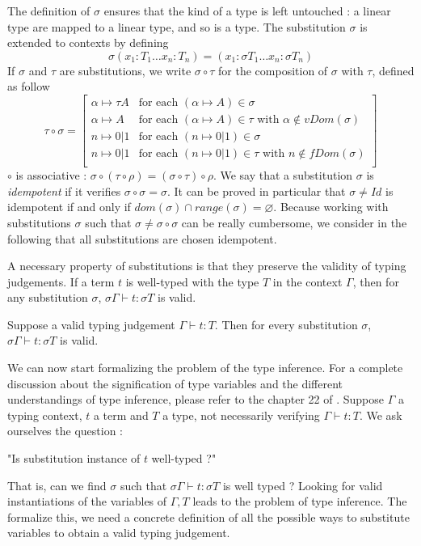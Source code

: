 \begin{defn}
 	The definition of $\sigma$ ensures that the kind of a type is left untouched : a linear type are mapped to a linear type, and so is a
 	type. The substitution $\sigma$ is extended to contexts by defining 
 		$$\sigma (x_1 : T_1 \dots x_n : T_n) = (x_1 : \sigma T_1 \dots x_n : \sigma T_n)$$
	If $\sigma$ and $\tau$ are substitutions, we write $\sigma \circ \tau$ for the composition of $\sigma$ with $\tau$, defined as follow
		$$\tau \circ \sigma = \left[ \begin{array}{ll}
																			\alpha \mapsto \tau A & \text{for each } (\alpha \mapsto A) \in \sigma \\
																			\alpha \mapsto A & \text{for each } (\alpha \mapsto A) \in \tau \text{ with } \alpha \notin vDom(\sigma) \\
																			n \mapsto 0|1 & \text{for each } (n \mapsto 0|1) \in \sigma \\
																			n \mapsto 0|1 & \text{for each } (n \mapsto 0|1) \in \tau \text{ with } n \notin fDom(\sigma) \\
																		\end{array} \right]$$
 	$\circ$ is associative : $\sigma \circ (\tau \circ \rho) = (\sigma \circ \tau) \circ \rho$. We say that a substitution $\sigma$ is
 	\textit{idempotent} if it verifies $\sigma \circ \sigma = \sigma$. It can be proved in particular that $\sigma \neq Id$ is idempotent if and
 	only if $dom(\sigma) \cap range(\sigma) = \varnothing$. Because working with substitutions $\sigma$ such that
 	$\sigma \neq \sigma \circ \sigma$ can be really cumbersome, we consider in the following that all substitutions are chosen idempotent.
\end{defn}

A necessary property of substitutions is that they preserve the validity of typing judgements. If a term $t$ is well-typed with the
type $T$ in the context $\Gamma$, then for any substitution $\sigma$, $\sigma \Gamma \vdash t : \sigma T$ is valid.

\begin{thm}
	\label{subs-judgement}
	Suppose a valid typing judgement $\Gamma \vdash t : T$. Then for every substitution $\sigma$, $\sigma \Gamma \vdash t : \sigma T$
	is valid.
\end{thm}

We can now start formalizing the problem of the type inference. For a complete discussion about the signification of type variables
and the different understandings of type inference, please refer to the chapter 22 of \cite{pierce}.
Suppose $\Gamma$ a typing context, $t$ a term and $T$ a type, not necessarily verifying $\Gamma \vdash t : T$. We ask ourselves the
question :
 \begin{center}
 	 "Is  substitution instance of $t$ well-typed ?"
 \end{center}
That is, can we find $\sigma$ such that $\sigma \Gamma \vdash t : \sigma T$ is well typed ? Looking for valid instantiations of the
variables of $\Gamma, T$ leads to the problem of type inference. The formalize this, we need a concrete definition of all the
possible ways to substitute variables to obtain a valid typing judgement.

